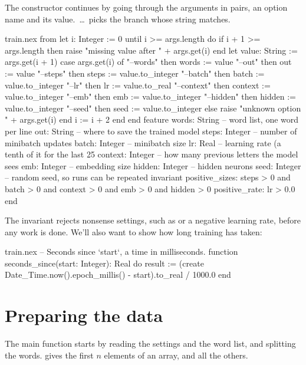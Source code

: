 \documentclass[11pt,a4paper,oneside,openany]{book}
\newcommand{\code}[1]{\texttt{\detokenize{#1}}}
\begin{document}
The constructor continues by going through the arguments in pairs, an
option name and its value. \code{case}\,\dots\,\code{of} picks the branch
whose string matches.

\begin{continued}{train.nex}
    from
      let i: Integer := 0
    until
      i >= args.length
    do
      if i + 1 >= args.length then
        raise "missing value after " + args.get(i)
      end
      let value: String := args.get(i + 1)
      case args.get(i) of
        "--words"   then words := value
        "--out"     then out := value
        "--steps"   then steps := value.to_integer
        "--batch"   then batch := value.to_integer
        "--lr"      then lr := value.to_real
        "--context" then context := value.to_integer
        "--emb"     then emb := value.to_integer
        "--hidden"  then hidden := value.to_integer
        "--seed"    then seed := value.to_integer
        else raise "unknown option " + args.get(i)
      end
      i := i + 2
    end
  end
feature
  words: String    -- word list, one word per line
  out: String      -- where to save the trained model
  steps: Integer   -- number of minibatch updates
  batch: Integer   -- minibatch size
  lr: Real         -- learning rate (a tenth of it for the last 25%
  context: Integer -- how many previous letters the model sees
  emb: Integer     -- embedding size
  hidden: Integer  -- hidden neurons
  seed: Integer    -- random seed, so runs can be repeated
invariant
  positive_sizes: steps > 0 and batch > 0 and context > 0 and emb > 0 and hidden > 0
  positive_rate: lr > 0.0
end
\end{continued}

The invariant rejects nonsense settings, such as \code{--steps 0} or a
negative learning rate, before any work is done. We'll also want to show
how long training has taken:

\begin{append}{train.nex}
-- Seconds since `start`, a time in milliseconds.
function seconds_since(start: Integer): Real do
  result := (create Date_Time.now().epoch_millis() - start).to_real / 1000.0
end
\end{append}

\section{Preparing the data}

The main function starts by reading the settings and the word list, and
splitting the words. \code{take(n)} gives the first $n$ elements of an
array, and \code{drop(n)} all the others.
\end{document}
